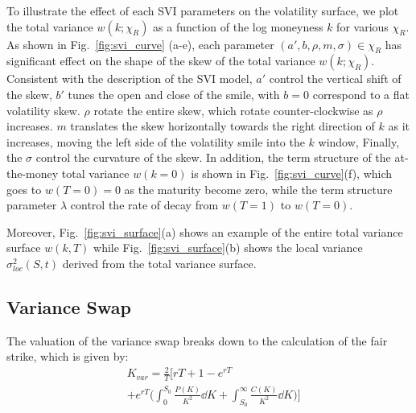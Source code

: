 \documentclass[%
 reprint,
 superscriptaddress,
nobibnotes,
 amsmath,amssymb,
 aps,
]{revtex4-2}
\begin{document}
To illustrate the effect of each SVI parameters on the volatility surface, we plot the total variance $w(k;\chi_R)$ as a function of the log moneyness $k$ for various $\chi_R$. As shown in Fig.~\ref{fig:svi_curve} (a-e), each parameter $(a',b,\rho,m,\sigma)\in\chi_R$ has significant effect on the shape of the skew of the total variance $w(k;\chi_R)$. Consistent with the description of the SVI model\cite{gatheral2014arbitrage}, $a'$ control the vertical shift of the skew, $b'$ tunes the open and close of the smile, with $b=0$ correspond to a flat volatility skew. $\rho$ rotate the entire skew, which rotate counter-clockwise as $\rho$ increases. $m$ translates the skew horizontally towards the right direction of $k$ as it increases, moving the left side of the volatility smile into the $k$ window, Finally, the $\sigma$ control the curvature of the skew. In addition, the term structure of the at-the-money total variance $w(k=0)$ is shown in Fig.~\ref{fig:svi_curve}(f), which goes to $w(T=0)=0$ as the maturity become zero, while the term structure parameter $\lambda$ control the rate of decay from $w(T=1)$ to $w(T=0)$. 

Moreover, Fig.~\ref{fig:svi_surface}(a) shows an example of the entire total variance surface $w(k,T)$ while Fig.~\ref{fig:svi_surface}(b) shows the local variance $\sigma^2_{loc}(S,t)$ derived from the total variance surface.

\subsection{Variance Swap}

The valuation of the variance swap breaks down to the calculation of the fair strike, which is given by: \cite{demeterfi1999more}
\begin{equation}
\begin{aligned}
    & K_{var} = \frac{2}{T} \biggl[ rT + 1 - e^{rT}  \\
              & +e^{rT} \biggl( \int_0^{S_0} \frac{P(K)}{K^2}  \dd{K} + \int_{S_0}^{\infty} \frac{C(K)}{K^2}  \dd{K} \biggr) \biggr]
\end{aligned}
\label{eq:variance_swap_Kvar}
\end{equation}
\end{document}
